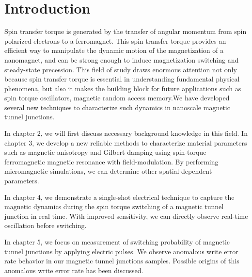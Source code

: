 \chapter{Introduction}

  Spin transfer torque is generated by the transfer of angular momentum from spin polarized electrons to a ferromagnet. This spin transfer torque provides an efficient way to manipulate the dynamic motion of the magnetization of a nanomagnet, and can be strong enough to induce magnetization switching and steady-state precession. This field of study draws enormous attention not only because spin transfer torque is essential in understanding fundamental physical phenomena, but also it makes the building block for future applications such as spin torque oscillators, magnetic random access memory.We have developed several new techniques to characterize such dynamics in nanoscale magnetic tunnel junctions.
  
  In chapter 2, we will first discuss necessary background  knowledge in this field. In chapter 3, we develop a new reliable methods to characterize material parameters such as magnetic anisotropy and Gilbert damping using spin-torque ferromagnetic magnetic resonance with field-modulation. By performing micromagnetic simulations, we can determine other spatial-dependent parameters.
  
  In chapter 4, we demonstrate a single-shot electrical technique to capture the magnetic dynamics during the spin torque switching of a magnetic tunnel junction in real time. With improved sensitivity, we can directly observe real-time oscillation before switching.
  
  In chapter 5, we focus on measurement of switching probability of magnetic tunnel junctions by applying electric pulses. We observe anomalous write error rate behavior in our magnetic tunnel junctions samples. Possible origins of this anomalous write error rate has been discussed.


